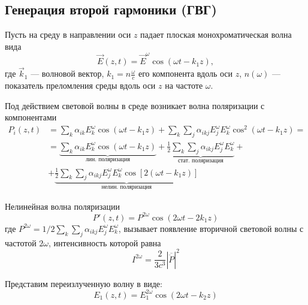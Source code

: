 \documentclass[a4paper, 12pt]{article}
\begin{document}
\subsection{Генерация второй гармоники (ГВГ)}
Пусть на среду в направлении оси $z$ падает плоская монохроматическая
волна вида
\begin{equation}
    \vec{E}(z, t) = \vec{E} ^{\omega} \cos (\omega t - k_1 z),
    \label{eq:4}
\end{equation}
где $\vec{k}_{1}$ --- волновой вектор, $k_1 = n \frac{\omega}{c}$ его компонента 
вдоль оси $z$, $n(\omega)$ --- показатель преломления среды вдоль оси
$z$ на частоте $\omega$.

Под действием световой волны в среде возникает волна поляризации с
компонентами 
\begin{equation}
    \begin{aligned}
        P _{i}(z, t) &= \sum\limits_{k} \alpha _{ik} E _{k}^{\omega}
        \cos (\omega t - k_1 z) + \sum\limits_{k}\sum\limits_{j}
        \alpha _{ikj} E _{j} ^{\omega} E _{k} ^{\omega} \cos ^{2}
        (\omega t - k_1 z) =\\
        &= \underbrace{\sum\limits_{k} \alpha _{ik} E _{k}^{\omega}
        \cos (\omega t - k_1 z)}_{\text{лин. поляризация}} +
        \underbrace{\frac{1}{2}
        \sum\limits_{k}\sum\limits_{j} \alpha _{ikj} E _{j} ^{\omega}
    E _{k} ^{\omega}}_{\text{стат. поляризация}} +\\
        &+ \underbrace{\frac{1}{2} \sum\limits_{k}\sum\limits_{j} \alpha _{ikj} E
        _{j} ^{\omega} E _{k} ^{\omega} \cos \left[ 2 (\omega t - k_1
    z) \right]}_{\text{нелин. поляризация}}
    \end{aligned}
\end{equation}

Нелинейная волна поляризации 
\begin{equation}
    P'(z,t) = P ^{2\omega} \cos (2\omega t - 2 k_1 z)
    \label{}
\end{equation}
где $P ^{2\omega} = 1/2 \sum\limits_{k}\sum\limits_{j} \alpha _{ikj}
E_j^\omega E_k^\omega$, вызывает появление вторичной световой волны с
частотой $2\omega$, интенсивность которой равна
\begin{equation}
    I ^{2\omega} = \frac{2}{3 c^3} | \overline{\ddot{P}}
    |^2
    \label{}
\end{equation}

Представим переизлученную волну в виде:
\begin{equation}
    E _{1} (z,t) = E_1 ^{2\omega} \cos (2\omega t - k_2 z)
    \label{}
\end{equation}
\end{document}
